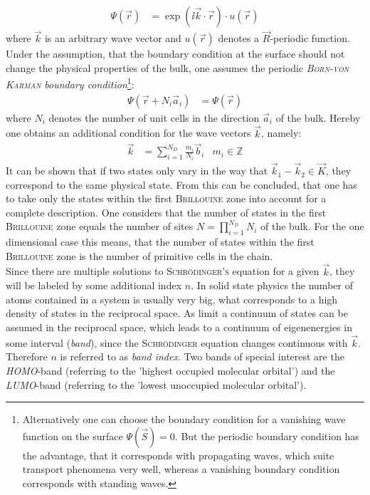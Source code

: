 \begin{align}
	\Psi(\vec{r}) &= \exp\left(\ii\vec{k}\cdot\vec{r}\right) \cdot u\left(\vec{r}\right)
\end{align}
where $\vec{k}$ is an arbitrary wave vector and $u\left(\vec{r}\right)$ denotes a $\vec{R}$-periodic function.\\
Under the assumption, that the boundary condition at the surface should not change the physical properties of the bulk, one assumes the periodic \emph{\textsc{Born-von Karman} boundary condition}\footnote{Alternatively one can choose the boundary condition  for a vanishing wave function on the surface $\Psi\left(\vec{S}\right) = 0$. But the periodic boundary condition has the advantage, that it corresponds with propagating waves, which suite transport phenomena very well, whereas a vanishing boundary condition corresponds with standing waves.}:
\begin{align}
	\Psi\left(\vec{r} + N_i \vec{a}_i\right) &= \Psi\left(\vec{r}\right)
\end{align}
where $N_i$ denotes the number of unit cells in the direction $\vec{a}_i$ of the bulk. Hereby one obtains an additional condition for the wave vectors $\vec{k}$, namely:
\begin{align}
	\vec{k} &= \sum_{i = 1}^{N_D} \frac{m_i}{N_i} \vec{b}_i & m_i \in \mathbb{Z} 
\end{align}
It can be shown that if two states only vary in the way that $\vec{k}_1 - \vec{k}_2 \in \vec{K}$, they correspond to the same physical state. From this can be concluded, that one has to take only the states within the first \textsc{Brillouine} zone into account for a complete description. One considers that the number of states in the first \textsc{Brillouine} zone equals the number of sites $N = \prod_{i = 1}^{N_D}N_i$ of the bulk. For the one dimensional case this means, that the number of states within the first \textsc{Brillouine} zone is the number of primitive cells in the chain.\\
Since there are multiple solutions to \textsc{Schrödinger's} equation for a given $\vec{k}$, they will be labeled by some additional index $n$. In solid state physics the number of atoms contained in a system is usually very big, what corresponds to a high density of states in the reciprocal space. As limit a continuum of states can be assumed in the reciprocal space, which leads to a continuum of eigenenergies in some interval (\emph{band}), since the \textsc{Schrödinger} equation changes continuous with $\vec{k}$. Therefore $n$ is referred to as \emph{band index}. Two bands of special interest are the \emph{HOMO}-band (referring to the 'highest occupied molecular orbital') and the \emph{LUMO}-band (referring to the 'lowest unoccupied molecular orbital').

